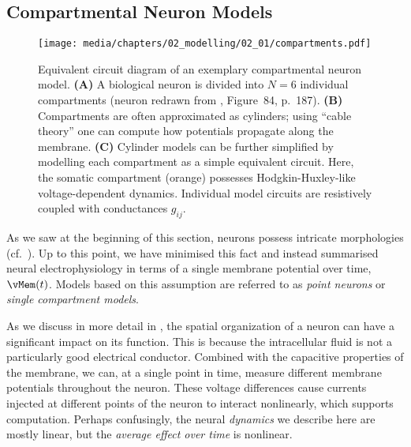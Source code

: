 
\subsection{Compartmental Neuron Models}
\label{sec:comp}

\begin{figure}
	\centering
	\texttt{[image: media/chapters/02\_modelling/02\_01/compartments.pdf]}
	{\label{fig:compartments_physical}}%
	{\label{fig:compartments_volumes}}%
	{\label{fig:compartments_circuit}}%
	\caption[Equivalent circuit of an exemplary compartmental neuron model]{Equivalent circuit diagram of an exemplary compartmental neuron model. \textbf{(A)} A biological neuron is divided into $N = 6$ individual compartments (neuron redrawn from \cite{howell1916textbook}, Figure~84, p.~187).
	\textbf{(B)} Compartments are often approximated as cylinders; using \enquote{cable theory} one can compute how potentials propagate along the membrane.
	\textbf{(C)} Cylinder models can be further simplified by modelling each compartment as a simple equivalent circuit. Here, the somatic compartment (orange) possesses Hodgkin-Huxley-like voltage-dependent dynamics. Individual model circuits are resistively coupled with conductances $g_{ij}$.
	}
	\label{fig:compartments}
\end{figure}

As we saw at the beginning of this section, neurons possess intricate morphologies (cf.~).
Up to this point, we have minimised this fact and instead summarised neural electrophysiology in terms of a single membrane potential over time, $\vMem(t)$.
Models based on this assumption are referred to as \emph{point neurons} or \emph{single compartment models}.

As we discuss in more detail in , the spatial organization of a neuron can have a significant impact on its function.
This is because the intracellular fluid is not a particularly good electrical conductor.
Combined with the capacitive properties of the membrane, we can, at a single point in time, measure different membrane potentials throughout the neuron.
These voltage differences cause currents injected at different points of the neuron to interact nonlinearly, which supports computation.
Perhaps confusingly, the neural \emph{dynamics} we describe here are mostly linear, but the \emph{average effect over time} is nonlinear.

